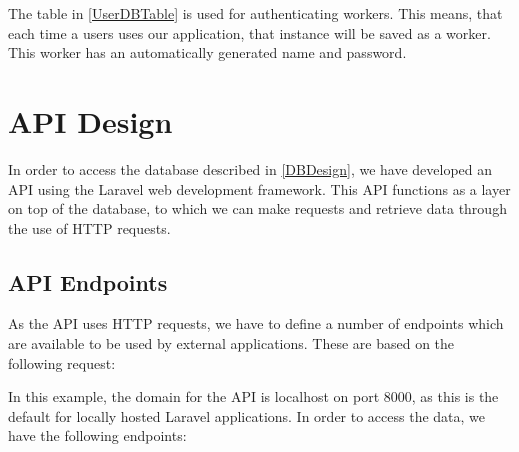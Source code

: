 The table in \autoref{UserDBTable} is used for authenticating workers. This
means, that each time a users uses our application, that instance will be saved
as a worker. This worker has an automatically generated name and password.


\section{API Design}
In order to access the database described in \autoref{DBDesign}, we have
developed an API using the Laravel web development framework. This API functions
as a layer on top of the database, to which we can make requests and retrieve
data through the use of HTTP requests.

\subsection{API Endpoints}
As the API uses HTTP requests, we have to define a number of endpoints which are
available to be used by external applications. These are based on the following
request:\nl

\nl

In this example, the domain for the API is localhost on port 8000, as this is
the default for locally hosted Laravel applications. In order to access the
data, we have the following endpoints:

